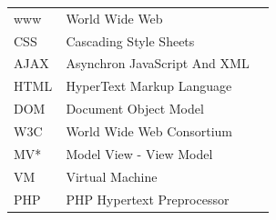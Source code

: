 \documentclass[a4paper,bibtotoc,oneside]{scrbook}
\begin{document}








\listoffigures
{} %
\newpage


\hspace{-17mm}\begin{tabular}{>{\raggedleft}p{0.2\linewidth} p{0.75\linewidth} p{0.1\linewidth}}

www & World Wide Web\\
CSS & Cascading Style Sheets\\
AJAX & Asynchron JavaScript And XML\\
HTML & HyperText Markup Language\\
DOM & Document Object Model\\
W3C & World Wide Web Consortium\\
MV* & Model View - View Model\\
VM & Virtual Machine\\
PHP & PHP Hypertext Preprocessor\\

\end{tabular}
\end{document}
